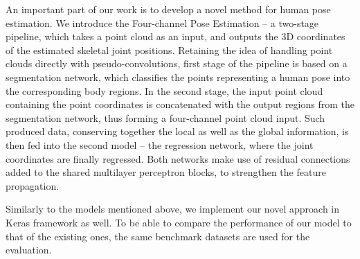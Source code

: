An important part of our work is to develop a novel method for human pose estimation. We introduce the Four-channel Pose Estimation – a two-stage pipeline, which takes a point cloud as an input, and outputs the 3D coordinates of the estimated skeletal joint positions. Retaining the idea of handling point clouds directly with pseudo-convolutions, first stage of the pipeline is based on a segmentation network, which classifies the points representing a human pose into the corresponding body regions. In the second stage, the input point cloud containing the point coordinates is concatenated with the output regions from the segmentation network, thus forming a four-channel point cloud input. Such produced data, conserving together the local as well as the global information, is then fed into the second model – the regression network, where the joint coordinates are finally regressed. Both networks make use of residual connections added to the shared multilayer perceptron blocks, to strengthen the feature propagation. \par
\vspace{5mm}
\noindent Similarly to the models mentioned above, we implement our novel approach in Keras framework as well. To be able to compare the performance of our model to that of the existing ones, the same benchmark datasets are used for the evaluation.






